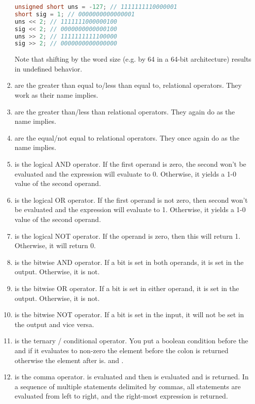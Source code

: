 \begin{enumerate}
	      \begin{lstlisting}[language=C]
unsigned short uns = -127; // 1111111110000001
short sig = 1; // 0000000000000001
uns << 2; // 1111111000000100
sig << 2; // 0000000000000100
uns >> 2; // 1111111111100000
sig >> 2; // 0000000000000000
\end{lstlisting}
    Note that shifting by the word size (e.g. by 64 in a 64-bit architecture) results in undefined behavior.
	\item \keyword{<=/>=} are the greater than equal to/less than equal to, relational operators.
    They work as their name implies.
	\item \keyword{</>} are the greater than/less than relational operators.
    They again do as the name implies.
	\item \keyword{==/\!=} are the equal/not equal to relational operators.
    They once again do as the name implies.
	\item \keyword{\&\&} is the logical AND operator.
    If the first operand is zero, the second won't be evaluated and the expression will evaluate to 0. Otherwise, it yields a 1-0 value of the second operand.
	\item \keyword{||} is the logical OR operator.
    If the first operand is not zero, then second won't be evaluated and the expression will evaluate to 1.
    Otherwise, it yields a 1-0 value of the second operand.
	\item \keyword{!} is the logical NOT operator.
    If the operand is zero, then this will return 1.
    Otherwise, it will return 0.
	\item \keyword{\&} is the bitwise AND operator.
    If a bit is set in both operands, it is set in the output.
    Otherwise, it is not.
	\item \keyword{|} is the bitwise OR operator.
    If a bit is set in either operand, it is set in the output.
    Otherwise, it is not.
	\item \keyword{~~} is the bitwise NOT operator.
    If a bit is set in the input, it will not be set in the output and vice versa.
	\item {} is the ternary / conditional operator.
    You put a boolean condition before the \? and if it evaluates to non-zero the element before the colon is returned otherwise the element after is.
     and .
	\item {} is the comma operator.
     is evaluated and then  is evaluated and  is returned.
    In a sequence of multiple statements delimited by commas, all statements are evaluated from left to right, and the right-most expression is returned.
\end{enumerate}

